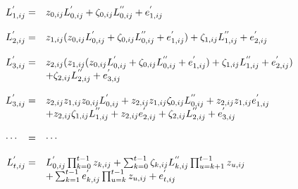 \documentclass[12pt]{article}
\providecommand{\DIFaddbegin}{} %
\providecommand{\DIFdelend}{} %
\newcommand{\DIFaddincludegraphics}[2][]{{\color{blue}\fbox{\DIFOincludegraphics[#1]{#2}}}} %
\DeclareRobustCommand{\DIFaddbegin}{\DIFOaddbegin \let\includegraphics\DIFaddincludegraphics} %
\DeclareRobustCommand{\DIFdelend}{\DIFOaddend \let\includegraphics\DIFOincludegraphics} %
\begin{document}
\begin{bibunit}
\begin{equation}
\DIFdelend \DIFaddbegin \begin{array}{rl}
L^{'}_{{1},ij} =& z_{{0},ij}L^{'}_{{0},ij}+\zeta_{{0},ij}L^{''}_{{0},ij}+e^{'}_{{1},ij}\\
\\
L^{'}_{{2},ij} =& z_{{1},ij}(z_{{0},ij}L^{'}_{{0},ij}+\zeta_{{0},ij}L^{''}_{{0},ij}+e^{'}_{{1},ij})+\zeta_{{1},ij}L^{''}_{{1},ij}+e^{'}_{{2},ij}\\
\\
L^{'}_{{3},ij} =& 
z_{{2},ij}(z_{{1},ij}(z_{{0},ij}L^{'}_{{0},ij}+\zeta_{{0},ij}L^{''}_{{0},ij}+e^{'}_{{1},ij})+\zeta_{{1},ij}L^{''}_{{1},ij}+e^{'}_{{2},ij})\\
&+\zeta_{{2},ij}L^{''}_{{2},ij}+e^{'}_{{3},ij}\\
\\
L^{'}_{{3},ij} =&z_{{2},ij}z_{{1},ij}z_{{0},ij}L^{'}_{{0},ij}+z_{{2},ij}z_{{1},ij}\zeta_{{0},ij}L^{''}_{{0},ij}+z_{{2},ij}z_{{1},ij}e_{{1},ij}^{'}\\
&+z_{{2},ij}\zeta_{{1},ij}L^{''}_{{1},ij}+z_{{2},ij}e_{{2},ij}^{'}+\zeta_{{2},ij}L^{''}_{{2},ij}+e_{{3},ij}^{'}\\
\\
\cdots \hspace{0.3cm}= &\cdots\\
\\
L^{'}_{{t},ij} =&L^{'}_{{0},ij}\prod_{k=0}^{t-1}z_{{k},ij}+\sum_{k=0}^{t-1}\zeta_{{k},ij}L^{''}_{{k},ij}\prod_{u=k+1}^{t-1}z_{{u},ij}\\
&+\sum_{k=1}^{t-1}e^{'}_{{k},ij}\prod_{u=k}^{t-1}z_{{u},ij}+e^{'}_{{t},ij}\\


\end{array}
\end{equation}
\end{bibunit}
\end{document}
